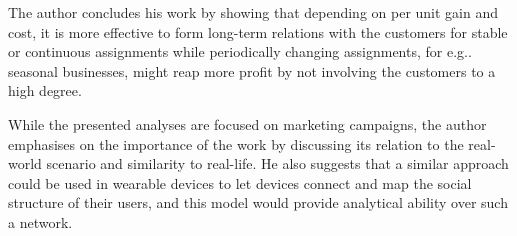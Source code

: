 The author concludes his work by showing that depending on per unit gain and cost, it is more effective to form long-term relations with the customers for stable or continuous assignments while periodically changing assignments, for e.g.. seasonal businesses, might reap more profit by not involving the customers to a high degree. 

While the presented analyses are focused on marketing campaigns, the author emphasises on the importance of the work by discussing its relation to the real-world scenario and similarity to real-life. He also suggests that a similar approach could be used in wearable devices to let devices connect and map the social structure of their users, and this model would provide analytical ability over such a network. 
